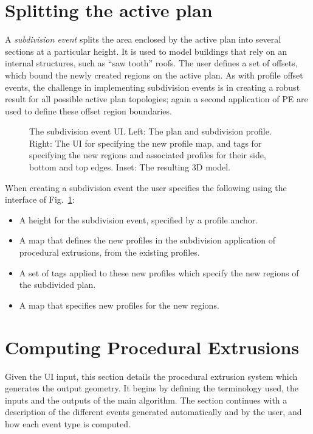 \FloatBarrier
\section{Splitting the active plan}

A \emph{subdivision event} splits the area enclosed by the active plan into several sections at a particular height. It is used to model buildings that rely on an internal structures, such as ``saw tooth'' roofs. The user defines a set of offsets, which bound the newly created regions on the active plan. As with profile offset events, the challenge in implementing subdivision events is in creating a robust result for all possible active plan topologies; again a second application of PE are used to define these offset region boundaries.

\begin{figure}
  \centering
 \def\svgwidth{1.0\columnwidth}
  
  \caption[The subdivision event UI]{\label{fig:subdivision_ui}The subdivision event UI. Left: The plan and subdivision profile. Right: The UI for specifying the new profile map, and tags for specifying the new regions and associated profiles for their side, bottom and top edges. Inset: The resulting 3D model.}
\end{figure}

When creating a subdivision event the user specifies the following using the interface of Fig.~\ref{fig:subdivision_ui}:
\begin{itemize}
\item{A height for the subdivision event, specified by a profile anchor.}
\item{A map that defines the new profiles in the subdivision application of procedural extrusions, from the existing profiles.}
\item{A set of tags applied to these new profiles which specify the new regions of the subdivided plan.}
\item{A map that specifies new profiles for the new regions.}
\end{itemize}

\FloatBarrier
\section{Computing Procedural Extrusions}
\label{sec:WSS}

Given the UI input, this section details the procedural extrusion system which generates the output geometry. It begins by defining the terminology used, the inputs and the outputs of the main algorithm. The section continues with a description of the different events generated automatically and by the user, and how each event type is computed.

